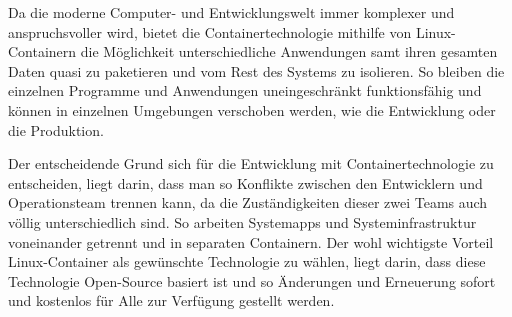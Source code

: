
Da die moderne Computer- und Entwicklungswelt immer komplexer und anspruchsvoller wird, bietet die Containertechnologie mithilfe von Linux-Containern die Möglichkeit unterschiedliche Anwendungen samt ihren gesamten Daten quasi zu paketieren und vom Rest des Systems zu isolieren. So bleiben die einzelnen Programme und Anwendungen uneingeschränkt funktionsfähig und können in einzelnen Umgebungen verschoben werden, wie die Entwicklung oder die Produktion. \cite{Container}

Der entscheidende Grund sich für die Entwicklung mit Containertechnologie zu entscheiden, liegt darin, dass man so Konflikte zwischen den Entwicklern und Operationsteam trennen kann, da die Zuständigkeiten dieser zwei Teams auch völlig unterschiedlich sind. So arbeiten Systemapps und Systeminfrastruktur voneinander getrennt und in separaten Containern. Der wohl wichtigste Vorteil Linux-Container als gewünschte Technologie zu wählen, liegt darin, dass diese Technologie Open-Source basiert ist und so Änderungen und Erneuerung sofort und kostenlos für Alle zur Verfügung gestellt werden. \cite{Container}
